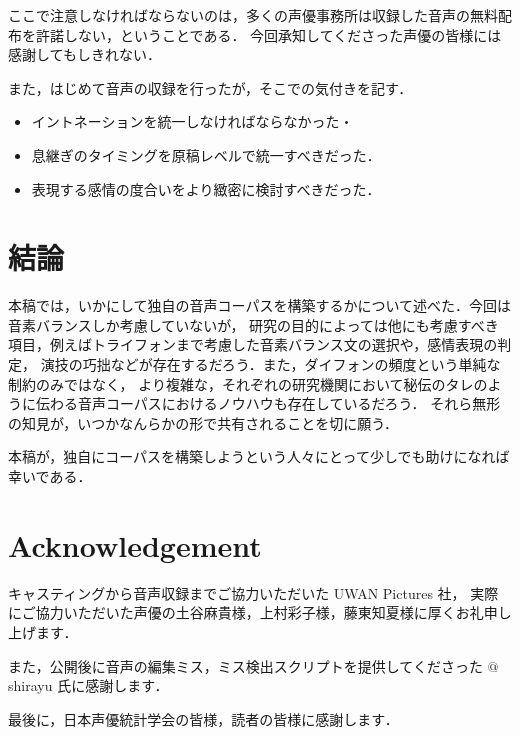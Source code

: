 \documentclass[final,10pt,twocolumn,3p,times,fleqn]{elsarticle}
\begin{document}
  ここで注意しなければならないのは，多くの声優事務所は収録した音声の無料配布を許諾しない，ということである．
  今回承知してくださった声優の皆様には感謝してもしきれない．

  また，はじめて音声の収録を行ったが，そこでの気付きを記す．

  \begin{itemize}
   \item イントネーションを統一しなければならなかった・	 
   \item 息継ぎのタイミングを原稿レベルで統一すべきだった．
   \item 表現する感情の度合いをより緻密に検討すべきだった．
  \end{itemize}

  \section{結論}
  本稿では，いかにして独自の音声コーパスを構築するかについて述べた．今回は音素バランスしか考慮していないが，
  研究の目的によっては他にも考慮すべき項目，例えばトライフォンまで考慮した音素バランス文の選択や，感情表現の判定，
  演技の巧拙などが存在するだろう．また，ダイフォンの頻度という単純な制約のみではなく，
  より複雑な，それぞれの研究機関において秘伝のタレのように伝わる音声コーパスにおけるノウハウも存在しているだろう．
  それら無形の知見が，いつかなんらかの形で共有されることを切に願う．

  本稿が，独自にコーパスを構築しようという人々にとって少しでも助けになれば幸いである．

  \section*{Acknowledgement}
  キャスティングから音声収録までご協力いただいた UWAN Pictures 社，
  実際にご協力いただいた声優の土谷麻貴様，上村彩子様，藤東知夏様に厚くお礼申し上げます．

  また，公開後に音声の編集ミス，ミス検出スクリプトを提供してくださった $@$shirayu 氏に感謝します．

  最後に，日本声優統計学会の皆様，読者の皆様に感謝します．
  
 
 
\end{document}
